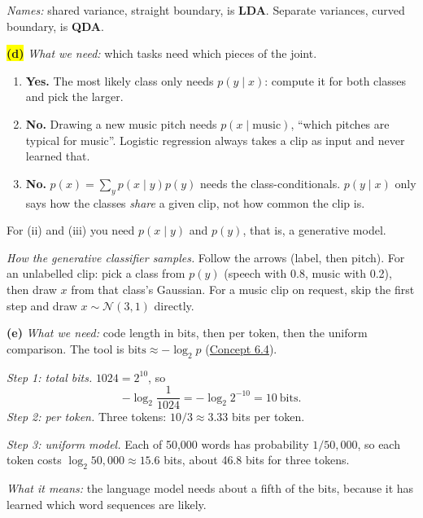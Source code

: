 \documentclass[12pt,a4paper]{article}
\begin{document}
\emph{Names:} shared variance, straight boundary, is \textbf{LDA}. Separate variances, curved boundary, is \textbf{QDA}.

\colorbox{yellow}{\textbf{(d)}} \emph{What we need:} which tasks need which pieces of the joint.
\begin{enumerate}[label=(\roman*),nosep]
  \item \textbf{Yes.} The most likely class only needs $p(y\mid x)$: compute it for both classes and pick the larger.
  \item \textbf{No.} Drawing a new music pitch needs $p(x\mid\text{music})$, ``which pitches are typical for music''. Logistic regression always takes a clip as input and never learned that.
  \item \textbf{No.} $p(x)=\sum_y p(x\mid y)p(y)$ needs the class-conditionals. $p(y\mid x)$ only says how the classes \emph{share} a given clip, not how common the clip is.
\end{enumerate}
For (ii) and (iii) you need $p(x\mid y)$ and $p(y)$, that is, a generative model.

\emph{How the generative classifier samples.} Follow the arrows (label, then pitch). For an unlabelled clip: pick a class from $p(y)$ (speech with 0.8, music with 0.2), then draw $x$ from that class's Gaussian. For a music clip on request, skip the first step and draw $x\sim\mathcal{N}(3,1)$ directly.

\textbf{(e)} \emph{What we need:} code length in bits, then per token, then the uniform comparison. The tool is $\text{bits}\approx-\log_2p$ (\hyperref[c6-4]{Concept 6.4}).

\emph{Step 1: total bits.} $1024=2^{10}$, so
\[
-\log_2\frac{1}{1024}=-\log_2 2^{-10}=10\ \text{bits}.
\]
\emph{Step 2: per token.} Three tokens: $10/3\approx3.33$ bits per token.

\emph{Step 3: uniform model.} Each of 50,000 words has probability $1/50{,}000$, so each token costs $\log_2 50{,}000\approx15.6$ bits, about 46.8 bits for three tokens.

\emph{What it means:} the language model needs about a fifth of the bits, because it has learned which word sequences are likely.
\end{document}
